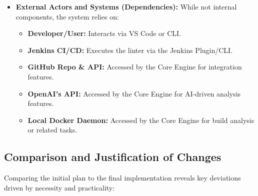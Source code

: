 \begin{itemize}
    \item \textbf{External Actors and Systems (Dependencies):} While not internal components, the system relies on:
        \begin{itemize}
            \item \textbf{Developer/User:} Interacts via VS Code or CLI.
            \item \textbf{Jenkins CI/CD:} Executes the linter via the Jenkins Plugin/CLI.
            \item \textbf{GitHub Repo \& API:} Accessed by the Core Engine for integration features.
            \item \textbf{OpenAI's API:} Accessed by the Core Engine for AI-driven analysis features.
            \item \textbf{Local Docker Daemon:} Accessed by the Core Engine for build analysis or related tasks.
        \end{itemize}
\end{itemize}

\subsection{Comparison and Justification of Changes}

Comparing the initial plan to the final implementation reveals key deviations driven by necessity and practicality:

